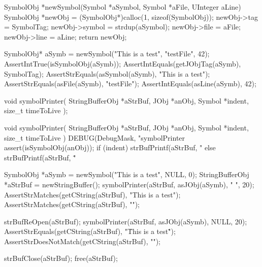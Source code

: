 \startCCode
SymbolObj *newSymbol(Symbol *aSymbol, Symbol *aFile, UInteger aLine) {
  SymbolObj *newObj =
    (SymbolObj*)calloc(1, sizeof(SymbolObj));
  newObj->tag    = SymbolTag;
  newObj->symbol = strdup(aSymbol);
  newObj->file   = aFile;
  newObj->line   = aLine;
  return newObj;
}
\stopCCode


\startCTest
  SymbolObj* aSymb = newSymbol("This is a test", "testFile", 42);
  AssertIntTrue(isSymbolObj(aSymb));
  AssertIntEquals(getJObjTag(aSymb), SymbolTag);
  AssertStrEquals(asSymbol(aSymb), "This is a test");
  AssertStrEquals(asFile(aSymb), "testFile");
  AssertIntEquals(asLine(aSymb), 42);
\stopCTest
\stopTestCase
\stopTestSuite

\startTestSuite[symbolPrinter]

\startCHeader
void symbolPrinter(
  StringBufferObj *aStrBuf,
  JObj            *anObj,
  Symbol          *indent,
  size_t           timeToLive
);
\stopCHeader

\startCCode
void symbolPrinter(
  StringBufferObj *aStrBuf,
  JObj            *anObj,
  Symbol          *indent,
  size_t           timeToLive
) {
  DEBUG(DebugMask, "symbolPrinter %
  assert(isSymbolObj(anObj));
  if (indent) {
    strBufPrintf(aStrBuf, "%
  } else {
    strBufPrintf(aStrBuf, "\"%
  }
}
\stopCCode


\startCTest
  SymbolObj *aSymb = newSymbol("This is a test", NULL, 0);
  StringBufferObj *aStrBuf = newStringBuffer();
  symbolPrinter(aStrBuf, asJObj(aSymb), "  ", 20);
  AssertStrMatches(getCString(aStrBuf), "This is a test");
  AssertStrMatches(getCString(aStrBuf), "\n");
  
  strBufReOpen(aStrBuf);
  symbolPrinter(aStrBuf, asJObj(aSymb), NULL, 20);
  AssertStrEquals(getCString(aStrBuf), "\"This is a test\" ");
  AssertStrDoesNotMatch(getCString(aStrBuf), "\n");
  
  strBufClose(aStrBuf);
  free(aStrBuf);
\stopCTest

\stopTestCase
\stopTestSuite